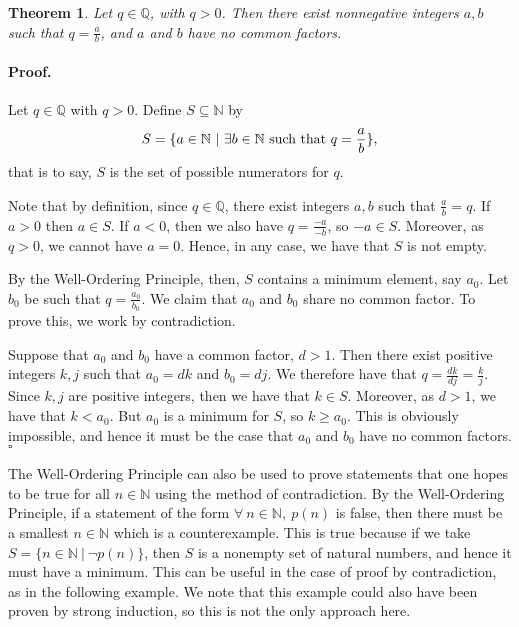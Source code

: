 \documentclass{article}
\newtheorem{theorem}{Theorem}
\theoremstyle{definition}
\renewenvironment{proof} {\paragraph{Proof.}}{\hfill$\square$}
\newcommand{\N}{\mathbb{N}}
\newcommand{\Q}{\mathbb{Q}}
\begin{document}
\begin{theorem}
Let $q\in \Q$, with $q> 0$. Then there exist nonnegative integers $a, b$ such that $q=\frac a b$, and $a$ and $b$ have no common factors.
\end{theorem}

\begin{proof}
Let $q\in \Q$ with $q>0$. Define $S\subseteq \N$ by \[ S=\{a\in\N\ | \ \exists b\in \N\hbox{ such that } q=\frac a b\},\]that is to say, $S$ is the set of possible numerators for $q$. 

Note that by definition, since $q\in \Q$, there exist integers $a, b$ such that $\frac a b = q$. If $a>0$ then $a\in S$. If $a<0$, then we also have $q=\frac{-a}{-b}$, so $-a\in S$. Moreover, as $q>0$, we cannot have $a=0$. Hence, in any case, we have that $S$ is not empty.

By the Well-Ordering Principle, then, $S$ contains a minimum element, say $a_0$. Let $b_0$ be such that $q=\frac{a_0}{b_0}$. We claim that $a_0$ and $b_0$ share no common factor. To prove this, we work by contradiction.

Suppose that $a_0$ and $b_0$ have a common factor, $d>1$. Then there exist positive integers $k, j$ such that $a_0=dk$ and $b_0=dj$. We therefore have that $q=\frac{dk}{dj} = \frac k j$. Since $k, j$ are positive integers, then we have that $k\in S$. Moreover, as $d>1$, we have that $k<a_0$. But $a_0$ is a minimum for $S$, so $k\geq a_0$. This is obviously impossible, and hence it must be the case that $a_0$ and $b_0$ have no common factors.
\end{proof}

The Well-Ordering Principle can also be used to prove statements that one hopes to be true for all $n\in\N$ using the method of contradiction. By the Well-Ordering Principle, if a statement of the form $\forall\ n\in\N,\ p(n)$ is false, then there must be a smallest $n\in\N$ which is a counterexample. This is true because if we take $S=\{n\in\N\ | \ \neg p(n)\}$, then $S$ is a nonempty set of natural numbers, and hence it must have a minimum. This can be useful in the case of proof by contradiction, as in the following example. We note that this example could also have been proven by strong induction, so this is not the only approach here.
\end{document}
